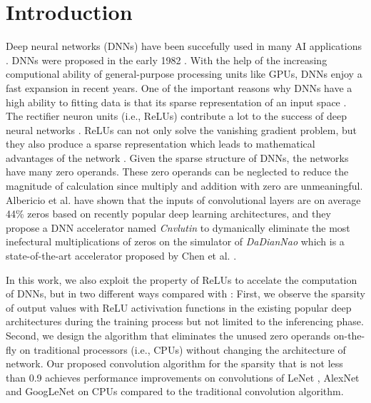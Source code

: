 \documentclass{article}
\begin{document}
\section{Introduction} \label{introduction}
Deep neural networks (DNNs) have been succefully used in many AI applications \cite{lecun2015deep}. DNNs were proposed in the early 1982 \cite{fukushima1982neocognitron}. With the help of the increasing computional ability of general-purpose processing units like GPUs, DNNs enjoy a fast expansion in recent years. One of the important reasons why DNNs have a high ability to fitting data is that its sparse representation of an input space \cite{willmore2001characterizing}. The rectifier neuron units (i.e., ReLUs) contribute a lot to the success of deep neural networks \cite{glorot2011deep,nair2010rectified,maas2013rectifier,lecun2015deep}. ReLUs can not only solve the vanishing gradient problem, but they also produce a sparse representation which leads to mathematical advantages of the network \cite{nair2010rectified}. Given the sparse structure of DNNs, the networks have many zero operands. These zero operands can be neglected to reduce the magnitude of calculation since multiply and addition with zero are unmeaningful. Albericio et al. \cite{albericio2016cnvlutin} have shown that the inputs of convolutional layers are on average 44\% zeros based on recently popular deep learning architectures, and they propose a DNN accelerator named \textit{Cnvlutin} to dymanically eliminate the most inefectural multiplications of zeros on the simulator of \textit{DaDianNao} which is a state-of-the-art accelerator proposed by Chen et al. \cite{chen2014dadiannao}.

In this work, we also exploit the property of ReLUs to accelate the computation of DNNs, but in two different ways compared with \cite{albericio2016cnvlutin}: First, we observe the sparsity of output values with ReLU activivation functions in the existing popular deep architectures during the training process but not limited to the inferencing phase. Second, we design the algorithm that eliminates the unused zero operands on-the-fly on traditional processors (i.e., CPUs) without changing the architecture of network. Our proposed convolution algorithm for the sparsity that is not less than 0.9 achieves performance improvements on convolutions of LeNet \cite{lecun1998gradient}, AlexNet \cite{krizhevsky2012imagenet} and GoogLeNet \cite{szegedy2015going} on CPUs compared to the traditional convolution algorithm.
\end{document}
